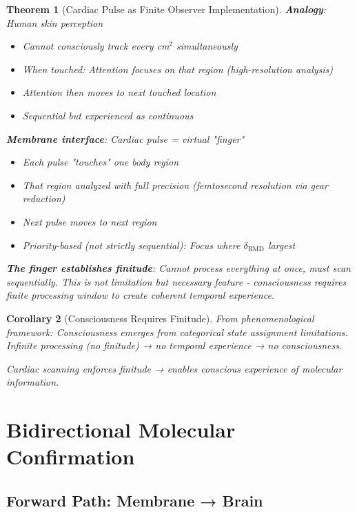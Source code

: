\documentclass[11pt,a4paper]{article}
\newtheorem{theorem}{Theorem}[section]
\newtheorem{corollary}[theorem]{Corollary}
\theoremstyle{definition}
\theoremstyle{remark}
\begin{document}
\begin{theorem}[Cardiac Pulse as Finite Observer Implementation]
\textbf{Analogy}: Human skin perception
\begin{itemize}
\item Cannot consciously track every cm$^2$ simultaneously
\item When touched: Attention focuses on that region (high-resolution analysis)
\item Attention then moves to next touched location
\item Sequential but experienced as continuous
\end{itemize}

\textbf{Membrane interface}: Cardiac pulse = virtual "finger"
\begin{itemize}
\item Each pulse "touches" one body region
\item That region analyzed with full precision (femtosecond resolution via gear reduction)
\item Next pulse moves to next region
\item Priority-based (not strictly sequential): Focus where $\delta_{\text{BMD}}$ largest
\end{itemize}

\textbf{The finger establishes finitude}: Cannot process everything at once, must scan sequentially. This is not limitation but \textit{necessary feature} - consciousness requires finite processing window to create coherent temporal experience.
\end{theorem}

\begin{corollary}[Consciousness Requires Finitude]
From phenomenological framework: Consciousness emerges from categorical state assignment limitations. Infinite processing (no finitude) → no temporal experience → no consciousness.

Cardiac scanning enforces finitude → enables conscious experience of molecular information.
\end{corollary}

\section{Bidirectional Molecular Confirmation}

\subsection{Forward Path: Membrane → Brain}
\end{document}
